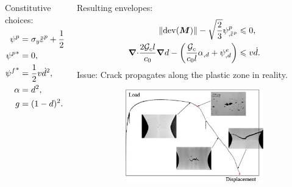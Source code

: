 \begin{frame}
\begin{overlayarea}{\textwidth}{0.4\textwidth}
{\begin{columns}
\begin{column}{0.4\textwidth}
          Constitutive choices:
          \begin{align*}
            \psi^p     & = \sigma_y \ep + \dfrac{1}{2} H \ep^2, \\
            {\psi^p}^* & = 0,                                   \\
            {\psi^f}^* & = \dfrac{1}{2} v \dot{d}^2,            \\
            \alpha     & = d^2,                                 \\
            g          & = (1-d)^2.                             
          \end{align*}
        \end{column}
        \begin{column}{0.6\textwidth}
          Resulting envelopes:
          \begin{align*}
            \norm{\dev(\bfM)} - \sqrt{\dfrac{2}{3}} \psi^p_{,\ep}                                                & \leqslant 0,         \\
            \divergence \dfrac{2\Gc l}{c_0} \grad d - \left( \dfrac{\Gc}{c_0 l}\alpha_{,d} + \psi^e_{,d} \right) & \leqslant v \dot{d}. 
          \end{align*}
          Issue: Crack propagates along the plastic zone in reality.
          \begin{figure}
            \centering
            \begin{subfigure}{0.4\textwidth}
              \centering
              \includegraphics[width=1\textwidth]{theory/figures/coupling}
            \end{subfigure}
            \begin{subfigure}{0.4\textwidth}

\end{subfigure}
\end{figure}
\end{column}
\end{columns}}
\end{overlayarea}
\end{frame}
